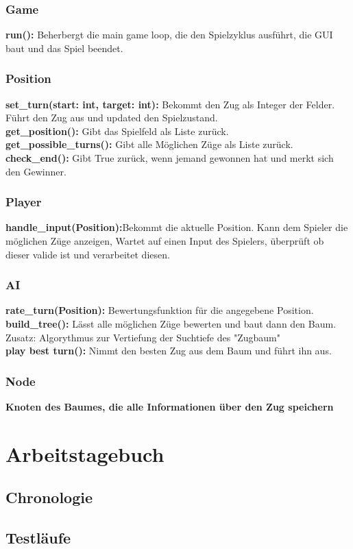 \documentclass{article}
\begin{document}
\subsubsection{Game}

\textbf{run():} Beherbergt die main game loop, die den Spielzyklus ausführt, die GUI baut und das Spiel beendet.

\subsubsection{Position}

\textbf{set\_turn(start: int, target: int):} Bekommt den Zug als Integer der Felder. Führt den Zug aus und updated den Spielzustand. \\
\textbf{get\_position():} Gibt das Spielfeld als Liste zurück. \\
\textbf{get\_possible\_turns():} Gibt alle Möglichen Züge als Liste zurück. \\
\textbf{check\_end():} Gibt True zurück, wenn jemand gewonnen hat und merkt sich den Gewinner. \\

\subsubsection{Player}

\textbf{handle\_input(Position):}Bekommt die aktuelle Position. Kann dem Spieler die möglichen Züge anzeigen, Wartet auf einen Input des Spielers, überprüft ob dieser valide
ist und verarbeitet diesen. \\

\subsubsection{AI}
\textbf{rate\_turn(Position):} Bewertungsfunktion für die angegebene Position. \\
\textbf{build\_tree():} Lässt alle möglichen Züge bewerten und baut dann den Baum. \\
Zusatz: Algorythmus zur Vertiefung der Suchtiefe des "Zugbaum"\\
\textbf{play best turn():} Nimmt den besten Zug aus dem Baum und führt ihn aus. \\

\subsubsection{Node}
\textbf{Knoten des Baumes, die alle Informationen über den Zug speichern}


\newpage
\section{Arbeitstagebuch}\label{section-diary}

\subsection{Chronologie}
\subsection{Testläufe}


\end{document}
